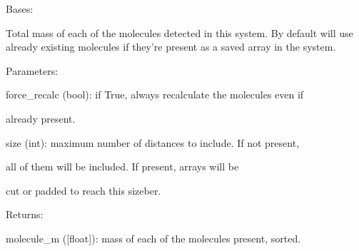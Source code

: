 \documentclass[letterpaper,10pt,english]{sphinxmanual}
\begin{document}

\begin{fulllineitems}
\label{doctree/soprano.properties.linkage.linkage:soprano.properties.linkage.linkage.MoleculeMass}
Bases: {\hyperref[doctree/soprano.properties.atomsproperty:soprano.properties.atomsproperty.AtomsProperty]{}}

Total mass of each of the molecules detected in this system. By default
will use already existing molecules if they're present as a saved array in
the system.

\begin{DUlineblock}{0em}
\item[] Parameters:
\item[]
\begin{DUlineblock}{\DUlineblockindent}
\item[] force\_recalc (bool): if True, always recalculate the molecules even if
\item[]
\begin{DUlineblock}{\DUlineblockindent}
\item[] already present.
\end{DUlineblock}
\item[] size (int): maximum number of distances to include. If not present,
\item[]
\begin{DUlineblock}{\DUlineblockindent}
\item[] all of them will be included. If present, arrays will be
\item[] cut or padded to reach this sizeber.
\end{DUlineblock}
\end{DUlineblock}
\end{DUlineblock}

\begin{DUlineblock}{0em}
\item[] Returns:
\item[]
\begin{DUlineblock}{\DUlineblockindent}
\item[] molecule\_m ({[}float{]}): mass of each of the molecules present, sorted.
\end{DUlineblock}
\end{DUlineblock}


\end{fulllineitems}
\end{document}
